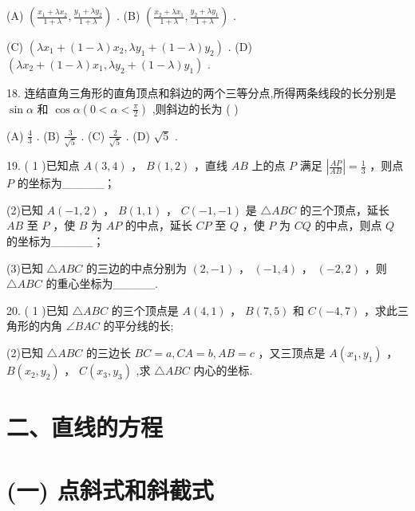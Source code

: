 \documentclass[10pt]{article}
\begin{document}
(A) \(\left( {\frac{{x}_{1} + \lambda {x}_{2}}{1 + \lambda },\frac{{y}_{1} + \lambda {y}_{2}}{1 + \lambda }}\right)\) . (B) \(\left( {\frac{{x}_{2} + \lambda {x}_{1}}{1 + \lambda },\frac{{y}_{2} + \lambda {y}_{1}}{1 + \lambda }}\right)\) .

(C) \(\left( {\lambda {x}_{1} + \left( {1 - \lambda }\right) {x}_{2},\lambda {y}_{1} + \left( {1 - \lambda }\right) {y}_{2}}\right)\) . (D) \(\left( {\lambda {x}_{2} + \left( {1 - \lambda }\right) {x}_{1},\lambda {y}_{2} + \left( {1 - \lambda }\right) {y}_{1}}\right)\) .

18. 连结直角三角形的直角顶点和斜边的两个三等分点,所得两条线段的长分别是 \(\sin \alpha\) 和 \(\cos \alpha \left( {0 < \alpha  < \frac{\pi }{2}}\right)\) ,则斜边的长为 ( )

(A) \(\frac{4}{3}\) . (B) \(\frac{3}{\sqrt{5}}\) . (C) \(\frac{2}{\sqrt{5}}\) . (D) \(\sqrt{5}\) .

19. ( 1 )已知点 \(A\left( {3,4}\right)\) ， \(B\left( {1,2}\right)\) ，直线 \({AB}\) 上的点 \(P\) 满足 \(\left| \frac{AP}{AB}\right|  = \frac{1}{3}\) ，则点 \(P\) 的坐标为\_\_\_\_\_；

(2)已知 \(A\left( {-1,2}\right)\) ， \(B\left( {1,1}\right)\) ， \(C\left( {-1, - 1}\right)\) 是 \(\bigtriangleup  {ABC}\) 的三个顶点，延长 \({AB}\) 至 \(P\) ，使 \(B\) 为 \({AP}\) 的中点，延长 \({CP}\) 至 \(Q\) ，使 \(P\) 为 \({CQ}\) 的中点，则点 \(Q\) 的坐标为\_\_\_\_\_；

(3)已知 \(\bigtriangleup  {ABC}\) 的三边的中点分别为 \(\left( {2, - 1}\right)\) ， \(\left( {-1,4}\right)\) ， \(\left( {-2,2}\right)\) ，则 \(\bigtriangleup  {ABC}\) 的重心坐标为\_\_\_\_\_.

20. ( 1 )已知 \(\bigtriangleup  {ABC}\) 的三个顶点是 \(A\left( {4,1}\right)\) ， \(B\left( {7,5}\right)\) 和 \(C\left( {{-4},7}\right)\) ，求此三角形的内角 \(\angle {BAC}\) 的平分线的长;

(2)已知 \(\bigtriangleup  {ABC}\) 的三边长 \({BC} = a,{CA} = b,{AB} = c\) ，又三顶点是 \(A\left( {{x}_{1},{y}_{1}}\right)\) ， \(B\left( {{x}_{2},{y}_{2}}\right)\) ， \(C\left( {{x}_{3},{y}_{3}}\right)\) ,求 \(\bigtriangleup {ABC}\) 内心的坐标.

\section*{二、直线的方程}

\section*{(一) 点斜式和斜截式}
\end{document}
